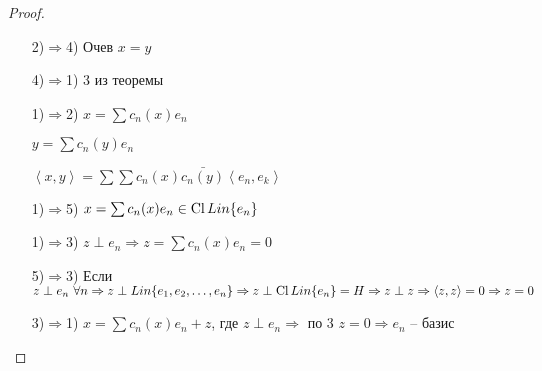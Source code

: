 \begin{proof}\thmslashn
	
	\begin{enumerate}
		\item[2)$\Rightarrow$4)]
		Очев $x = y$
		
		\item[4)$\Rightarrow$1)]
		3 из теоремы
		
		\item[1)$\Rightarrow$2)]
		$x = \sum c_n(x)e_n$
		
		$y = \sum c_n(y)e_n$
		
		$\left\langle x, y\right\rangle = \sum\sum c_n(x)\bar{c_n(y)} \left\langle e_n, e_k\right\rangle $
		
		\item[1)$\Rightarrow$5)]
		$x = \sum c_n(x)e_n \in \operatorname{Cl} Lin\{e_n\}$
		
		\item[1)$\Rightarrow$3)]
		$z\perp e_n \Rightarrow z = \sum c_n(x)e_n = 0$
		
		\item[5)$\Rightarrow$3)]
		Если $z \perp e_n \,\,\forall n \Rightarrow z\perp Lin\{e_1, e_2, \ldots, e_n\} \Rightarrow z\perp \operatorname{Cl} Lin\{e_n\} = H \Rightarrow z\perp z \Rightarrow \left\langle z, z\right\rangle = 0 \Rightarrow z = 0$
		
		\item[3)$\Rightarrow$1)]
		$x = \sum c_n(x)e_n + z$, где $z \perp e_n \Rightarrow$ по 3 $z = 0 \Rightarrow e_n$ -- базис
		
		
	\end{enumerate}	
	
\end{proof}
